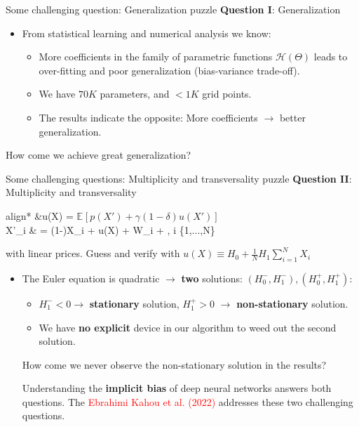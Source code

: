\documentclass[aspectratio=169,10pt]{beamer}
\newcommand{\emphcolor}[1]{\textbf{\textcolor{emphcolorval}{#1}}}
\newcommand{\expec}[2][]{\ensuremath{\mathbb{E}_{{#1}}\left[ {#2} \right]}}
\begin{document}
\begin{frame}{Some challenging question: Generalization puzzle}
	\emphcolor{Question I}: Generalization 
	\begin{itemize}
		\item From statistical learning and numerical analysis we know:\vspace{0.1in}
		\begin{itemize}
			\item More coefficients in the family of parametric functions $\mathcal{H}(\Theta)$ leads to over-fitting and poor generalization (bias-variance trade-off).\vspace{0.1in}
		  \item We have $70K$ parameters, and $<1K$ grid points.\vspace{0.1in}
			\item The results indicate the opposite: More coefficients $\rightarrow$ better generalization.  \vspace{0.1in}
		\end{itemize}
	\end{itemize}
How come we achieve great generalization?  
\end{frame}

\begin{frame}{Some challenging questions: Multiplicity and transversality puzzle}
\emphcolor{Question II}: Multiplicity and transversality 
	\begin{empheq}[box=\tcbhighmath]{align*}
		&\gamma u(X) = \beta \expec{p(X')+\gamma (1-\delta) u(X') }\\
		  X'_i & = (1-\delta)X_i + u(X) + \sigma W_i + \eta \omega,\quad{} i \in \{1,...,N\}
	\end{empheq}
with linear prices. Guess and verify with $u(X) \equiv H_0 + \frac{1}{N} H_1 \sum_{i=1}^N X_i$  
\begin{itemize}
		\item The Euler equation is quadratic $\rightarrow$ \emphcolor{two} solutions: $(H_0^-, H_1^-), (H_0^+, H_1^+)$:\vspace{0.1in}
	\begin{itemize}
		\item $H_1^- <0 \rightarrow$  \emphcolor{stationary} solution, $H_1^+ > 0$ $\rightarrow$ \emphcolor{non-stationary} solution. \vspace{0.1in}
		\item We have \emphcolor{no explicit} device in our algorithm to weed out the second solution. \vspace{0.1in}
	\end{itemize}
	How come we never observe the non-stationary solution in the results? 
	\vspace{0.1in}
	
	Understanding the \emphcolor{implicit bias} of deep neural networks answers both questions. The \textcolor{red}{Ebrahimi Kahou et al. (2022)} addresses these two challenging questions. 
\end{itemize}
\end{frame}	
				
\end{document}
